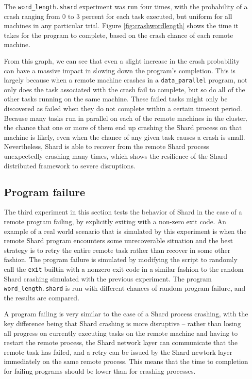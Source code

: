 \documentclass[twoside]{report}
\begin{document}
The \texttt{word\_length.shard} experiment was run four times, with the probability of a crash ranging from 0 to 3 percent for each task executed, but uniform for all machines in any particular trial.
Figure \ref{fig:crashwordlength} shows the time it takes for the program to complete, based on the crash chance of each remote machine.

From this graph, we can see that even a slight increase in the crash probability can have a massive impact in slowing down the program's completion.
This is largely because when a remote machine crashes in a \texttt{data\_parallel} program, not only does the task associated with the crash fail to complete, but so do all of the other tasks running on the same machine.
These failed tasks might only be discovered as failed when they do not complete within a certain timeout period.
Because many tasks run in parallel on each of the remote machines in the cluster, the chance that one or more of them end up crashing the Shard process on that machine is likely, even when the chance of any given task causes a crash is small.
Nevertheless, Shard is able to recover from the remote Shard process unexpectedly crashing many times, which shows the resilience of the Shard distributed framework to severe disruptions.

\subsection{Program failure}
The third experiment in this section tests the behavior of Shard in the case of a remote program failing, by explicitly exiting with a non-zero exit code.
An example of a real world scenario that is simulated by this experiment is when the remote Shard program encounters some unrecoverable situation and the best strategy is to retry the entire remote task rather than recover in some other fashion.
The program failure is simulated by modifying the script to randomly call the \texttt{exit} builtin with a nonzero exit code in a similar fashion to the random Shard crashing simulated with the previous experiment.
The program \texttt{word\_length.shard} is run with different chances of random program failure, and the results are compared.

A program failing is very similar to the case of a Shard process crashing, with the key difference being that Shard crashing is more disruptive -- rather than losing all progress on currently executing tasks on the remote machine and having to restart the remote process, the Shard network layer can communicate that the remote task has failed, and a retry can be issued by the Shard newtork layer immediately on the same remote process.
This means that the time to completion for failing programs should be lower than for crashing processes.
\end{document}
